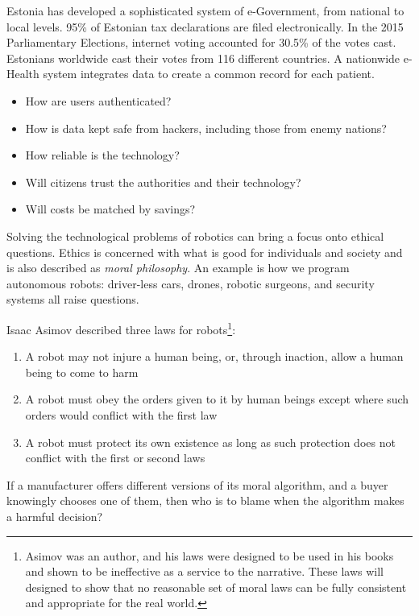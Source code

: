 \documentclass[../main.tex]{subfile}
\begin{document}
Estonia has developed a sophisticated system of e-Government, from national to local levels. 95\% of Estonian tax declarations are filed electronically. In the 2015 Parliamentary Elections, internet voting accounted for 30.5\% of the votes cast. Estonians worldwide cast their votes from 116 different countries. A nationwide e-Health system integrates data to create a common record for each patient.
\begin{itemize}
	\item How are users authenticated?
	\item How is data kept safe from hackers, including those from enemy nations?
	\item How reliable is the technology?
	\item Will citizens trust the authorities and their technology?
	\item Will costs be matched by savings?
\end{itemize}


Solving the technological problems of robotics can bring a focus onto ethical questions. Ethics is concerned with what is good for individuals and society and is also described as \textit{moral philosophy}. An example is how we program autonomous robots: driver-less cars, drones, robotic surgeons, and security systems all raise questions.

Isaac Asimov described three laws for robots\footnote{Asimov was an author, and his laws were designed to be used in his books and shown to be ineffective as a service to the narrative. These laws will designed to show that no reasonable set of moral laws can be fully consistent and appropriate for the real world.}:
\begin{enumerate}
	\item A robot may not injure a human being, or, through inaction, allow a human being to come to harm
	\item A robot must obey the orders given to it by human beings except where such orders would conflict with the first law
	\item A robot must protect its own existence as long as such protection does not conflict with the first or second laws
\end{enumerate}


If a manufacturer offers different versions of its moral algorithm, and a buyer knowingly chooses one of them, then who is to blame when the algorithm makes a harmful decision?
\end{document}
